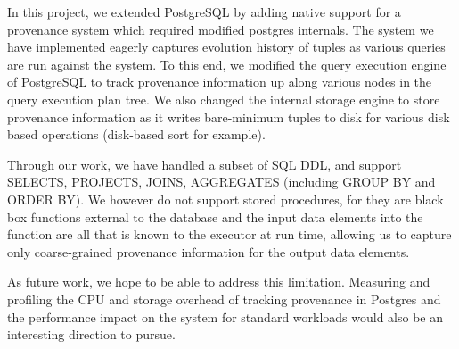 In this project, we extended PostgreSQL by adding native support for a provenance system which required modified postgres internals. The system we have implemented eagerly captures evolution history of tuples as various queries are run against the system. To this end, we modified the query execution engine of PostgreSQL to track provenance information up along various nodes in the query execution plan tree. We also changed the internal storage engine to store provenance information as it writes bare-minimum tuples to disk for various disk based operations (disk-based sort for example).

Through our work, we have handled a subset of SQL DDL, and support SELECTS, PROJECTS, JOINS, AGGREGATES (including GROUP BY and ORDER BY).  We however do not support stored procedures, for they are black box functions external to the database and the input data elements into the function are all that is known to the executor at run time, allowing us to capture only coarse-grained provenance information for the output data elements. 

As future work, we hope to be able to address this limitation. Measuring and profiling the CPU and storage overhead of tracking provenance in Postgres and the performance impact on the system for standard workloads would also be an interesting direction to pursue.


